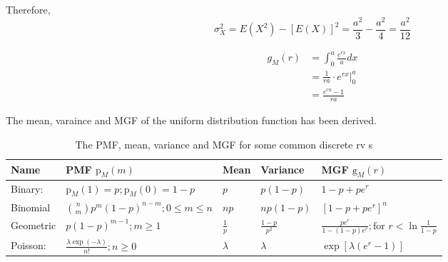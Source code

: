 \documentclass[UTF8]{article}
\begin{document}
\begin{enumerate}
            Therefore, 
            \begin{equation*}
                \sigma^2_X=E(X^2)-[E(X)]^2=\frac{a^2}{3}-\frac{a^2}{4}=\frac{a^2}{12}
            \end{equation*}
            
            \begin{equation*}
                \begin{split}
                    g_M(r)&=\int^a_0\frac{e^{rx}}{a}dx\\
                    &=\frac{1}{ra}\cdot e^{rx}\big|^a_0\\
                    &=\frac{e^{ra}-1}{ra}
                \end{split}
            \end{equation*}

            The mean, varaince and MGF of the uniform distribution function has been derived.
    \end{enumerate}

    \begin{table}[h]
        \centering
        \caption{The PMF, mean, variance and MGF for some common discrete rv s}
        \begin{spacing}{2.0}
            \begin{tabular}{lllll}
                \hline
                Name & PMF $\text{p}_M(m)$ & Mean & Variance & MGF $\text{g}_M(r)$\\
                \hline
                Binary: & $\text{p}_M(1)=p;\text{p}_M(0)=1-p$ & $p$ & $p(1-p)$ & $1-p+pe^r$\\
                Binomial & $\binom{n}{m}p^m(1-p)^{n-m};0\leq m\leq n$ & $np$ & $np(1-p)$ & $[1-p+pe^r]^n$\\
                Geometric & $p(1-p)^{m-1};m\geq1$ & $\frac{1}{p}$ & $\frac{1-p}{p^2}$ & $\frac{pe^r}{1-(1-p)e^r};\text{for }r<\ln\frac{1}{1-p}$\\
                Poisson: & $\frac{\lambda\exp(-\lambda)}{n!};n\geq0$ & $\lambda$ & $\lambda$ & $\exp[\lambda(e^r-1)]$\\
                \hline           
            \end{tabular}
        \end{spacing}
    \end{table}
\end{document}
